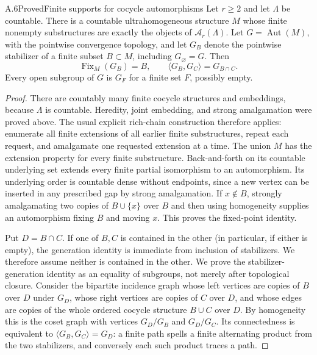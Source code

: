 \begin{claim}{A.6}{Proved}{Finite supports for cocycle automorphisms}\label{A:cocycle-supports}
Let $r\geq2$ and let $\Lambda$ be countable. There is a countable ultrahomogeneous structure $M$ whose finite nonempty substructures are exactly the objects of $\mathcal A_r(\Lambda)$. Let $G=\operatorname{Aut}(M)$, with the pointwise convergence topology, and let $G_B$ denote the pointwise stabilizer of a finite subset $B\subset M$, including $G_\varnothing=G$. Then
\[
 \operatorname{Fix}_M(G_B)=B,\qquad
 \langle G_B,G_C\rangle=G_{B\cap C}.
\]
Every open subgroup of $G$ is $G_F$ for a finite set $F$, possibly empty.
\end{claim}
\begin{proof}
There are countably many finite cocycle structures and embeddings, because $\Lambda$ is countable. Heredity, joint embedding, and strong amalgamation were proved above. The usual explicit rich-chain construction therefore applies: enumerate all finite extensions of all earlier finite substructures, repeat each request, and amalgamate one requested extension at a time. The union $M$ has the extension property for every finite substructure. Back-and-forth on its countable underlying set extends every finite partial isomorphism to an automorphism. Its underlying order is countable dense without endpoints, since a new vertex can be inserted in any prescribed gap by strong amalgamation. If $x\notin B$, strongly amalgamating two copies of $B\cup\{x\}$ over $B$ and then using homogeneity supplies an automorphism fixing $B$ and moving $x$. This proves the fixed-point identity.

Put $D=B\cap C$. If one of $B,C$ is contained in the other (in particular, if either is empty), the generation identity is immediate from inclusion of stabilizers. We therefore assume neither is contained in the other. We prove the stabilizer-generation identity as an equality of subgroups, not merely after topological closure. Consider the bipartite incidence graph whose left vertices are copies of $B$ over $D$ under $G_D$, whose right vertices are copies of $C$ over $D$, and whose edges are copies of the whole ordered cocycle structure $B\cup C$ over $D$. By homogeneity this is the coset graph with vertices $G_D/G_B$ and $G_D/G_C$. Its connectedness is equivalent to $\langle G_B,G_C\rangle=G_D$: a finite path spells a finite alternating product from the two stabilizers, and conversely each such product traces a path.


\end{proof}
